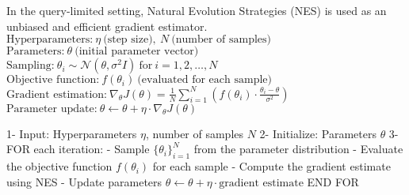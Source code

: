 In the query-limited setting, Natural Evolution Strategies (NES) is used as an unbiased and efficient gradient estimator.
$\text{Hyperparameters:} \ \eta \ \text{(step size)}, \ N \ \text{(number of samples)}$
$\text{Parameters:} \ \theta \ \text{(initial parameter vector)}$
$\text{Sampling:} \ \theta_i \sim \mathcal{N}(\theta, \sigma^2 I) \ \text{for} \ i = 1, 2, \ldots, N$
$\text{Objective function:} \ f(\theta_i) \ \text{(evaluated for each sample)}$
$\text{Gradient estimation:} \ \nabla_{\theta} J(\theta) = \frac{1}{N} \sum_{i=1}^{N} \left( f(\theta_i) \cdot \frac{\theta_i - \theta}{\sigma^2} \right)$
$\text{Parameter update:} \ \theta \leftarrow \theta + \eta \cdot \nabla_{\theta} J(\theta)$

1- Input: Hyperparameters $\eta$, number of samples $N$
2- Initialize: Parameters $\theta$
3- FOR each iteration:
    - Sample $\{ \theta_i \}_{i=1}^N$ from the parameter distribution
    - Evaluate the objective function $f(\theta_i)$ for each sample
    - Compute the gradient estimate using NES
    - Update parameters $\theta \leftarrow \theta + \eta \cdot \text{gradient estimate}$ 
    END FOR


